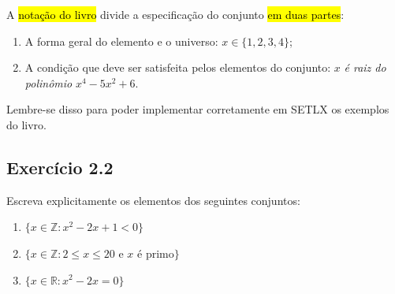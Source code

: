 \documentclass[
  letterpaper,
  DIV=11,
  numbers=noendperiod]{scrreprt}
\providecommand{\tightlist}{%
  \setlength{\itemsep}{0pt}\setlength{\parskip}{0pt}}\usepackage{longtable,booktabs,array}
\begin{document}
\begin{tcolorbox}
A {\hl{notação do livro}} divide a especificação do conjunto {\hl{em
duas partes}}:

\begin{enumerate}
\def\labelenumi{\arabic{enumi}.}
\tightlist
\item
  A forma geral do elemento e o universo: $x \in \{1, 2, 3, 4\}$;
\item
  A condição que deve ser satisfeita pelos elementos do conjunto: $x$
  \emph{é raiz do polinômio} $x^4 - 5x^2 + 6$.
\end{enumerate}

Lembre-se disso para poder implementar corretamente em SETLX os exemplos
do livro.

\end{tcolorbox}

\subsection*{Exercício 2.2}\label{exr-2-2}

Escreva explicitamente os elementos dos seguintes conjuntos:

\begin{enumerate}
\def\labelenumi{\alph{enumi})}
\item
  $\{ x \in \mathbb{Z}: x^2 - 2x + 1 < 0 \}$
\item
  $\{ x \in \mathbb{Z}: 2 \leq x \leq 20 \text{ e } x \text{ é primo} \}$
\item
  $\{ x \in \mathbb{R}: x^2 - 2x = 0 \}$
\end{enumerate}
\end{document}
